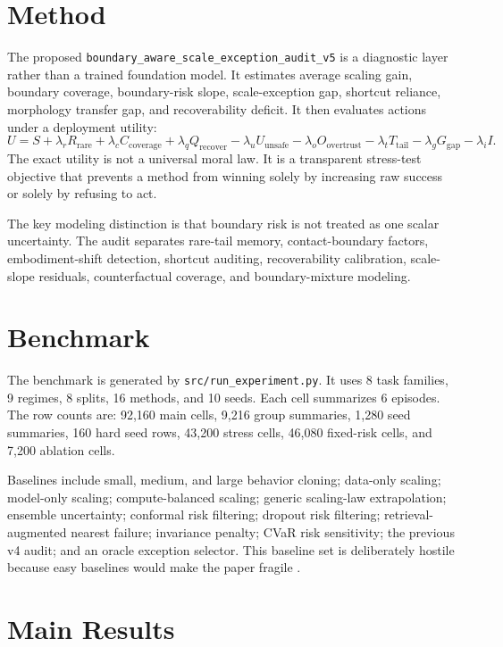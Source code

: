 \documentclass{article}
\begin{document}
\section{Method}
The proposed \texttt{boundary\_aware\_scale\_exception\_audit\_v5} is a diagnostic layer rather than a trained foundation model. It estimates average scaling gain, boundary coverage, boundary-risk slope, scale-exception gap, shortcut reliance, morphology transfer gap, and recoverability deficit. It then evaluates actions under a deployment utility:
\[
U = S + \lambda_r R_{\mathrm{rare}} + \lambda_c C_{\mathrm{coverage}} + \lambda_q Q_{\mathrm{recover}}
- \lambda_u U_{\mathrm{unsafe}} - \lambda_o O_{\mathrm{overtrust}}
- \lambda_t T_{\mathrm{tail}} - \lambda_g G_{\mathrm{gap}} - \lambda_i I.
\]
The exact utility is not a universal moral law. It is a transparent stress-test objective that prevents a method from winning solely by increasing raw success or solely by refusing to act.

The key modeling distinction is that boundary risk is not treated as one scalar uncertainty. The audit separates rare-tail memory, contact-boundary factors, embodiment-shift detection, shortcut auditing, recoverability calibration, scale-slope residuals, counterfactual coverage, and boundary-mixture modeling.

\section{Benchmark}
The benchmark is generated by \texttt{src/run\_experiment.py}. It uses 8 task families, 9 regimes, 8 splits, 16 methods, and 10 seeds. Each cell summarizes 6 episodes. The row counts are: 92,160 main cells, 9,216 group summaries, 1,280 seed summaries, 160 hard seed rows, 43,200 stress cells, 46,080 fixed-risk cells, and 7,200 ablation cells.

Baselines include small, medium, and large behavior cloning; data-only scaling; model-only scaling; compute-balanced scaling; generic scaling-law extrapolation; ensemble uncertainty; conformal risk filtering; dropout risk filtering; retrieval-augmented nearest failure; invariance penalty; CVaR risk sensitivity; the previous v4 audit; and an oracle exception selector. This baseline set is deliberately hostile because easy baselines would make the paper fragile \citep{mandlekar2021robomimic,thananjeyan2021recovery,angelopoulos2021conformal,kaelbling2013beliefspace,sun2025transforming1}.

\section{Main Results}

\end{document}
